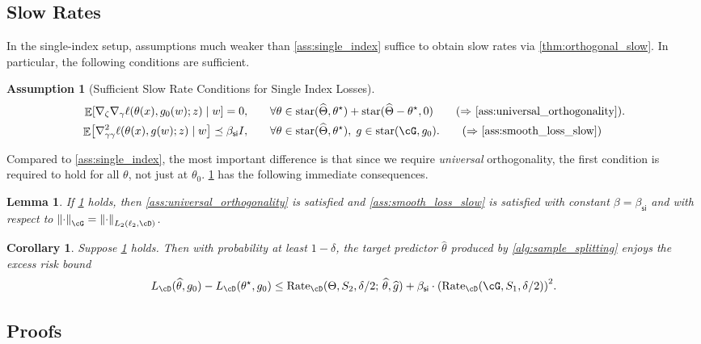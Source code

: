 \documentclass[11pt]{article} %
\newcommand{\pref}[1]{\cref{#1}}
\theoremstyle{theorem}  %
\newtheorem{lemma}{Lemma}
\newtheorem{corollary}{Corollary}
\newtheorem{assumption}{Assumption}
\theoremstyle{plain}
\DeclarePairedDelimiter{\brk}{[}{]}
\DeclarePairedDelimiter{\prn}{(}{)}
\DeclarePairedDelimiter{\nrm}{\|}{\|}
\DeclareMathOperator{\En}{\mathbb{E}}
\newcommand{\wh}[1]{\widehat{#1}}
\newcommand{\grad}{\nabla}
\newcommand{\midsem}{;\,}
\newcommand{\starhull}{\mathrm{star}}
\newcommand{\varone}{w} %
\newcommand{\vartwo}{x} %
\newcommand{\estone}{\wh{g}}
\newcommand{\esttwo}{\wh{\theta}}
\newcommand{\nuisance}{\cG}
\newcommand{\target}{\Theta}
\newcommand{\targetemp}{\wh{\Theta}}
\newcommand{\Rate}{\mathrm{Rate}_{\cD}}
\newcommand{\besttwo}{\theta^{\star}}
\newcommand{\gtone}{g_0}
\newcommand{\sampleone}{S_1}
\newcommand{\sampletwo}{S_2}
\newcommand{\si}{\mathsf{si}}
\newcommand{\betasi}{\beta_{\si}}
\begin{document}
\subsection{Slow Rates} 
In the single-index setup, assumptions much weaker than \pref{ass:single_index} suffice to obtain slow rates via \pref{thm:orthogonal_slow}. In particular, the following conditions are sufficient.
\begin{assumption}[Sufficient Slow Rate Conditions for Single Index Losses]\label{ass:gradient_conditions_slow}
\begin{align}
\En\brk*{\grad{}_{\zeta}\grad_{\gamma}\ell(\theta(\vartwo),g_0(\varone);z)\mid{}\varone}= 0, & \quad\quad \forall \theta\in\starhull(\targetemp,\besttwo) + \starhull(\targetemp-\besttwo,0) \tag{$\Rightarrow$ \pref{ass:universal_orthogonality}}.\\
\En\brk*{\nabla_{\gamma\gamma}^2 \ell(\theta(\vartwo), g(\varone); z) \mid \varone}\preceq \betasi I, & \quad\quad\forall\theta\in\starhull(\targetemp,\besttwo),\; g\in\starhull(\nuisance,\gtone). \tag{$\Rightarrow$ \pref{ass:smooth_loss_slow}}
\end{align}
\end{assumption}Compared to \pref{ass:single_index}, the most important difference is that since we require \emph{universal} orthogonality, the first condition is required to hold for all $\theta$, not just at $\theta_0$. \pref{ass:gradient_conditions_slow} has the following immediate consequences.
\begin{lemma}
\label{lem:sufficient_slow}
If \pref{ass:gradient_conditions_slow} holds, then \pref{ass:universal_orthogonality} is satisfied and \pref{ass:smooth_loss_slow} is satisfied with constant $\beta=\betasi$ and with respect to $\nrm*{\cdot}_{\nuisance} = \nrm*{\cdot}_{L_2(\ell_2, \cD)}$.
\end{lemma}
%
\begin{corollary}
  \label{cor:sufficient_slow}
Suppose \pref{ass:gradient_conditions_slow} holds. Then with probability at least $1-\delta$, the target predictor $\esttwo$ produced by \pref{alg:sample_splitting} enjoys the excess risk bound
\[
L_{\cD}(\esttwo,\gtone) - L_{\cD}(\besttwo, \gtone) 
\leq{}  \Rate(\target, \sampletwo, \delta/2\midsem{}\esttwo,\estone) + \betasi \cdot\prn*{\Rate(\nuisance,\sampleone,\delta/2)}^{2}.
\]
\end{corollary}


%
%
%
%
\subsection{Proofs}
\label{app:sufficient}
%
%
\end{document}
